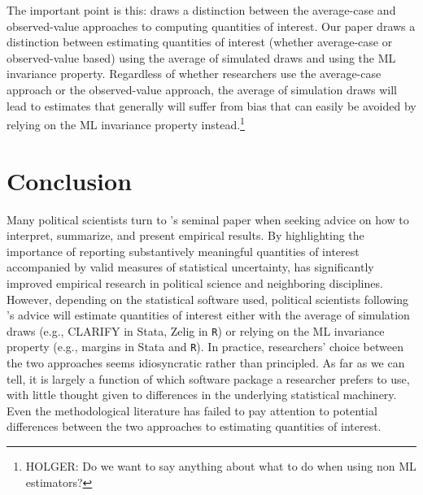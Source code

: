\documentclass[11pt]{article}
\begin{document}
The important point is this: \cite{HanmerKalkan2013} draws a distinction between the average-case and observed-value approaches to computing
quantities of interest. Our paper draws a distinction between estimating quantities of interest (whether average-case or observed-value based) using the average of simulated draws and using the ML invariance property. Regardless of whether researchers use the average-case approach or the observed-value approach, the average of simulation draws will lead to estimates that generally will suffer from bias that can easily be avoided by relying on the ML invariance property instead.\footnote{\color{red} HOLGER: Do we want to say anything about what to do when using non ML estimators?}

\section*{Conclusion}

Many political scientists turn to \cite{KingTomzWittenberg2000}'s seminal paper when seeking advice on how to interpret, summarize, and present empirical results. By highlighting the importance of reporting substantively meaningful quantities of interest accompanied by valid measures of statistical uncertainty, \cite{KingTomzWittenberg2000} has significantly improved empirical research in political science and neighboring disciplines. However, depending on the statistical software used, political scientists following \cite{KingTomzWittenberg2000}'s advice will estimate quantities of interest either with the average of simulation draws (e.g., CLARIFY in Stata, Zelig in \texttt{R}) or relying on the ML invariance property (e.g., margins in Stata and \texttt{R}). In practice, researchers' choice between the two approaches seems idiosyncratic rather than principled. As far as we can tell, it is largely a function of which software package a researcher prefers to use, with little thought given to differences in the underlying statistical machinery. Even the methodological literature has failed to pay attention to potential differences between the two approaches to estimating quantities of interest.
\end{document}

